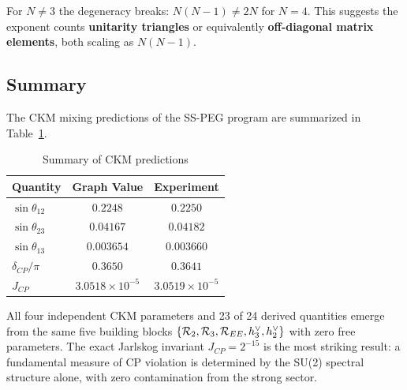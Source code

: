 For $N \neq 3$ the degeneracy breaks: $N(N-1) \neq 2N$ for $N = 4$. This suggests the exponent counts \textbf{unitarity triangles} or equivalently \textbf{off-diagonal matrix elements}, both scaling as $N(N-1)$.

\subsection{Summary}\label{sec:ckm_summary}

The CKM mixing predictions of the SS-PEG program are summarized in Table~\ref{tab:ckm_summary}.

\begin{table}[h]
\centering
\caption{Summary of CKM predictions}
\label{tab:ckm_summary}
\begin{tabular}{lcc}
\hline\hline
Quantity & Graph Value & Experiment \\
\hline
$\sin\theta_{12}$ & $0.2248$ & $0.2250$ \\
$\sin\theta_{23}$ & $0.04167$ & $0.04182$ \\
$\sin\theta_{13}$ & $0.003654$ & $0.003660$ \\
$\delta_{CP}/\pi$ & $0.3650$ & $0.3641$ \\
$J_{CP}$ & $3.0518 \times 10^{-5}$ & $3.0519 \times 10^{-5}$ \\
\hline\hline
\end{tabular}
\end{table}

All four independent CKM parameters and 23 of 24 derived quantities emerge from the same five building blocks $\{\mathcal{R}_2, \mathcal{R}_3, \mathcal{R}_{EE}, h^\vee_3, h^\vee_2\}$ with zero free parameters. The exact Jarlskog invariant $J_{CP} = 2^{-15}$ is the most striking result: a fundamental measure of CP violation is determined by the SU(2) spectral structure alone, with zero contamination from the strong sector.
